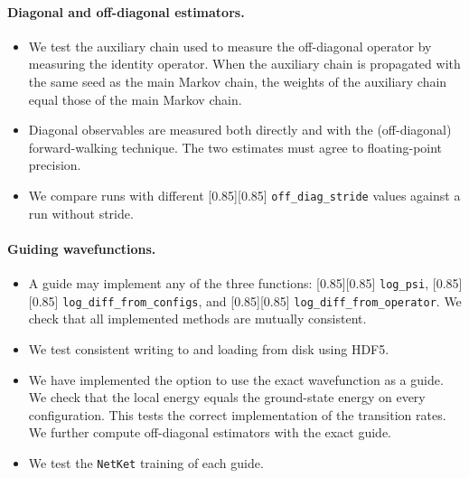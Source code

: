 \documentclass{SciPost}
\newcommand{\pyinline}[1]{\begingroup\setlength{\fboxsep}{0pt}%
  \colorbox{gray!15}{\raisebox{0pt}[0.85\ht\strutbox][0.85\dp\strutbox]{%
    \hspace{1pt}\lstinline{#1}\hspace{1pt}}}\endgroup}
\begin{document}
\paragraph{Diagonal and off-diagonal estimators.}
\begin{itemize}
	\item We test the auxiliary chain used to measure the off-diagonal operator by measuring the identity operator. 
		When the auxiliary chain is propagated with the same seed as the main Markov chain, the weights of the auxiliary chain equal those of the main Markov chain.

	\item Diagonal observables are measured both directly and with the (off-diagonal) forward-walking technique.
		The two estimates must agree to floating-point precision.

	\item We compare runs with different \pyinline{off_diag_stride} values against a run without stride.
\end{itemize}


\paragraph{Guiding wavefunctions.}
\begin{itemize}
	\item A guide may implement any of the three functions:
		\pyinline{log_psi}, \pyinline{log_diff_from_configs}, and \pyinline{log_diff_from_operator}.
		We check that all implemented methods are mutually consistent.

	\item We test consistent writing to and loading from disk using HDF5.

	\item We have implemented the option to use the exact wavefunction as a guide.
		We check that the local energy equals the ground-state energy on every configuration. 
		This tests the correct implementation of the transition rates.
		We further compute off-diagonal estimators with the exact guide.
	
	\item We test the \texttt{NetKet} training of each guide.
\end{itemize}
\end{document}
